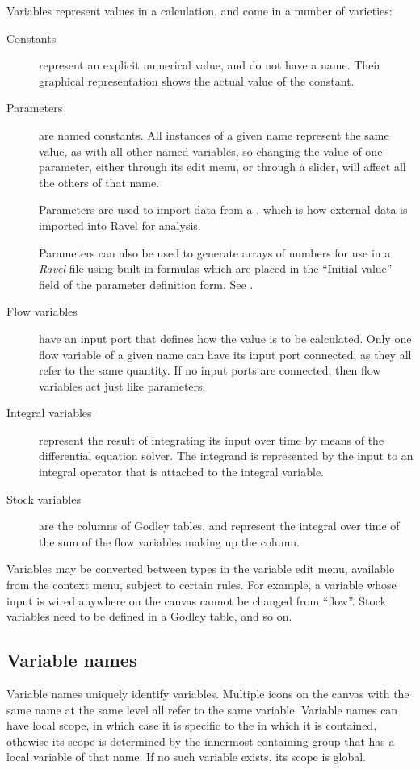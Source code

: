 Variables represent values in a calculation, and come in a number
of varieties: 
\begin{description}
\item [{Constants}] represent an explicit numerical value, and do not have
a name. Their graphical representation shows the actual value of the
constant. 
\item [{Parameters}] are named constants. All instances of a given name
represent the same value, as with all other named variables, so changing
the value of one parameter, either through its edit menu, or through
a slider, will affect all the others of that name.

Parameters are used to import data from a ,
which is how external data is imported into Ravel for analysis.

Parameters can also be used to generate arrays of numbers for
use in a \emph{Ravel} file using built-in formulas which are placed
in the ``Initial value'' field of the parameter definition form.
See .
\item [{Flow variables}] have an input port that defines how the value
is to be calculated. Only one flow variable of a given name can have
its input port connected, as they all refer to the same quantity.
If no input ports are connected, then flow variables act just like
parameters. 
\item [{Integral variables}] represent the result of integrating its input
over time by means of the differential equation solver. The integrand
is represented by the input to an integral operator that is attached
to the integral variable. 
\item [{Stock variables}] are the columns of Godley tables, and represent
the integral over time of the sum of the flow variables making up
the column. 
\end{description}
Variables may be converted between types in the variable edit menu,
available from the context menu, subject to certain rules. For example,
a variable whose input is wired anywhere on the canvas cannot be changed
from ``flow''. Stock variables need to be defined in a Godley table,
and so on.

\subsection{Variable names}

Variable names uniquely identify variables. Multiple icons on the
canvas with the same name at the same level all refer to the same
variable. Variable names can have local scope, in which case it
is specific to the  in which it is contained,
othewise its scope is determined by the innermost containing group
that has a local variable of that name. If no such variable exists,
its scope is global.

